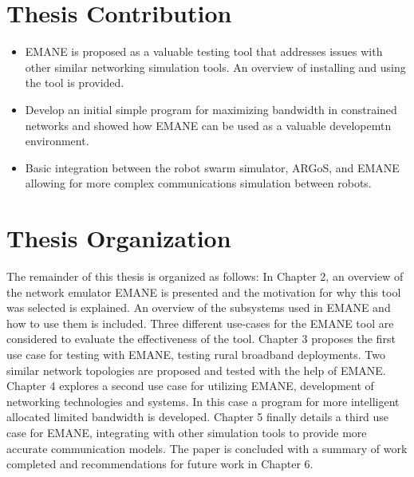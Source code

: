\section{Thesis Contribution}
\begin{itemize}
    \item EMANE is proposed as a valuable testing tool that addresses issues with other similar networking simulation tools. An overview of installing and using the tool is provided.
    \item Develop an initial simple program for maximizing bandwidth in constrained networks and showed how EMANE can be used as a valuable developemtn environment.
    \item Basic integration between the robot swarm simulator, ARGoS, and EMANE allowing for more complex communications simulation between robots.
\end{itemize}


\section{Thesis Organization}
The remainder of this thesis is organized as follows:
In Chapter 2, an overview of the network emulator EMANE is presented and the motivation for why this tool was selected is explained. An overview of the subsystems used in EMANE and how to use them is included.
Three different use-cases for the EMANE tool are considered to evaluate the effectiveness of the tool.
Chapter 3 proposes the first use case for testing with EMANE, testing rural broadband deployments. Two similar network topologies are proposed and tested with the help of EMANE.
Chapter 4 explores a second use case for utilizing EMANE, development of networking technologies and systems. In this case a program for more intelligent allocated limited bandwidth is developed.
Chapter 5 finally details a third use case for EMANE, integrating with other simulation tools to provide more accurate communication models.
The paper is concluded with a summary of work completed and recommendations for future work in Chapter 6.
